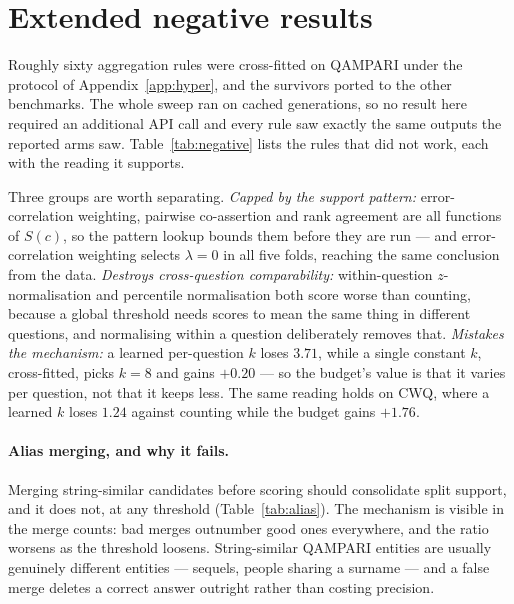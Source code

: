 \documentclass[11pt]{article}
\begin{document}
\section{Extended negative results}
\label{app:negative}

Roughly sixty aggregation rules were cross-fitted on QAMPARI under the protocol of Appendix~\ref{app:hyper}, and the survivors ported to the other benchmarks. The whole sweep ran on cached generations, so no result here required an additional API call and every rule saw exactly the same outputs the reported arms saw. Table~\ref{tab:negative} lists the rules that did not work, each with the reading it supports.

Three groups are worth separating. \emph{Capped by the support pattern:} error-correlation weighting, pairwise co-assertion and rank agreement are all functions of $S(c)$, so the pattern lookup bounds them before they are run --- and error-correlation weighting selects $\lambda = 0$ in all five folds, reaching the same conclusion from the data. \emph{Destroys cross-question comparability:} within-question $z$-normalisation and percentile normalisation both score worse than counting, because a global threshold needs scores to mean the same thing in different questions, and normalising within a question deliberately removes that. \emph{Mistakes the mechanism:} a learned per-question $k$ loses $3.71$, while a single constant $k$, cross-fitted, picks $k=8$ and gains $+0.20$ --- so the budget's value is that it varies per question, not that it keeps less. The same reading holds on CWQ, where a learned $k$ loses $1.24$ against counting while the budget gains $+1.76$.

\paragraph{Alias merging, and why it fails.}
Merging string-similar candidates before scoring should consolidate split support, and it does not, at any threshold (Table~\ref{tab:alias}). The mechanism is visible in the merge counts: bad merges outnumber good ones everywhere, and the ratio worsens as the threshold loosens. String-similar QAMPARI entities are usually genuinely different entities --- sequels, people sharing a surname --- and a false merge deletes a correct answer outright rather than costing precision.
\end{document}
